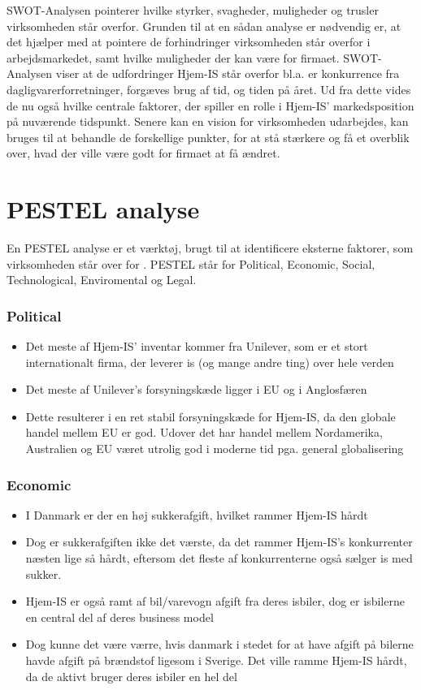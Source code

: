 SWOT-Analysen\cite{Organisation} pointerer hvilke styrker, svagheder, muligheder og trusler virksomheden står overfor. Grunden til at en sådan analyse er nødvendig er, at det hjælper med at pointere de forhindringer virksomheden står overfor i arbejdsmarkedet, samt hvilke muligheder der kan være for firmaet. SWOT-Analysen viser at de udfordringer Hjem-IS står overfor bl.a. er konkurrence fra dagligvarerforretninger, forgæves brug af tid, og tiden på året. Ud fra dette vides de nu også hvilke centrale faktorer, der spiller en rolle i Hjem-IS' markedsposition på nuværende tidspunkt.
Senere kan en vision for virksomheden udarbejdes, kan bruges til at behandle de forskellige punkter, for at stå stærkere og få et overblik over, hvad der ville være godt for firmaet at få ændret.

\section{PESTEL analyse}
En PESTEL analyse er et værktøj, brugt til at identificere eksterne faktorer, som virksomheden står over for \cite{Oxford}. PESTEL står for Political, Economic, Social, Technological, Enviromental og Legal. 
\subsubsection{Political}
\begin{itemize}
    \item Det meste af Hjem-IS’ inventar kommer fra Unilever, som er et stort internationalt firma, der leverer is (og mange andre ting) over hele verden
    \item Det meste af Unilever’s forsyningskæde ligger i EU og i Anglosfæren
    \item Dette resulterer i en ret stabil forsyningskæde for Hjem-IS, da den globale handel mellem EU er god. Udover det har handel mellem Nordamerika, Australien og EU været utrolig god i moderne tid pga. general globalisering
\end{itemize}
\subsubsection{Economic}
\begin{itemize}
    \item I Danmark er der en høj sukkerafgift\cite{Sugar}, hvilket rammer Hjem-IS hårdt
    \item Dog er sukkerafgiften ikke det værste, da det rammer Hjem-IS’s konkurrenter næsten lige så hårdt, eftersom det fleste af konkurrenterne også sælger is med sukker.
    \item Hjem-IS er også ramt af bil/varevogn afgift fra deres isbiler, dog er isbilerne en central del af deres business model
    \item Dog kunne det være værre, hvis danmark i stedet for at have afgift på bilerne havde afgift på brændstof ligesom i Sverige. Det ville ramme Hjem-IS hårdt, da de aktivt bruger deres isbiler en hel del
\end{itemize}
